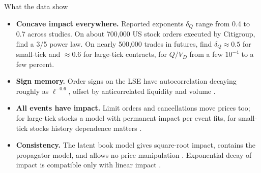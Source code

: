 \documentclass[aspectratio=169,10pt]{beamer}
\begin{document}
\begin{frame}{What the data show}
  \small
  \begin{itemize}
    \item \textbf{Concave impact everywhere.} Reported exponents $\delta_Q$ range from 0.4 to 0.7 across studies. On about 700,000 US stock orders executed by Citigroup, \citet{almgren2005direct} find a 3/5 power law. On nearly 500,000 trades in futures, \citet{toth2011anomalous} find $\delta_Q \approx 0.5$ for small-tick and $\approx 0.6$ for large-tick contracts, for $Q/V_D$ from a few $10^{-4}$ to a few percent.
    \item \textbf{Sign memory.} Order signs on the LSE have autocorrelation decaying roughly as $\ell^{-0.6}$, offset by anticorrelated liquidity and volume \citep{lillo2004long}.
    \item \textbf{All events have impact.} Limit orders and cancellations move prices too; for large-tick stocks a model with permanent impact per event fits, for small-tick stocks history dependence matters \citep{eisler2012price}.
    \item \textbf{Consistency.} The latent book model gives square-root impact, contains the propagator model, and allows no price manipulation \citep{donier2015fully}. Exponential decay of impact is compatible only with linear impact \citep{gatheral2010no}.
  \end{itemize}
\end{frame}
\end{document}
